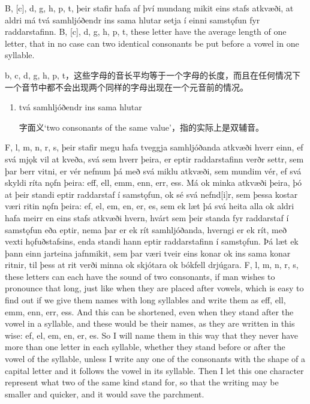 \begin{paracol}{2}
    B, [c], d, g, h, p, t, þeir stafir hafa af því mundang mikit eins stafs atkvæði, at aldri má tvá samhljóðendr ins sama hlutar setja í einni samstǫfun fyr raddarstafinn.
    \switchcolumn
    B, [c], d, g, h, p, t, these letter have the average length of one letter, that in no case can two identical consonants be put before a vowel in one syllable.
\end{paracol}
\begin{translation*}{}
    b, c, d, g, h, p, t，这些字母的音长平均等于一个字母的长度，而且在任何情况下一个音节中都不会出现两个同样的字母出现在一个元音前的情况。
\end{translation*}
\begin{grammar*}{}
    \begin{enumerate}[leftmargin=*]
        \item tvá samhljóðendr ins sama hlutar

              字面义`two consonants of the same value'，指的实际上是双辅音。
    \end{enumerate}
\end{grammar*}
\begin{paracol}{2}
    F, l, m, n, r, s, þeir stafir megu hafa tveggja samhljóðanda atkvæði hverr einn, ef svá mjǫk vil at kveða, svá sem hverr þeira, er eptir raddarstafinn verðr settr, sem þar berr vitni, er vér nefnum þá með svá miklu atkvæði, sem mundim vér, ef svá skyldi ríta nǫfn þeira: eff, ell, emm, enn, err, ess. Má ok minka atkvæði þeira, þó at þeir standi eptir raddarstaf í samstǫfun, ok sé svá nefnd[i]r, sem þessa kostar væri ritin nǫfn þeira: ef, el, em, en, er, es, sem ek læt þá svá heita alla ok aldri hafa meirr en eins stafs atkvæði hvern, hvárt sem þeir standa fyr raddarstaf í samstǫfun eða eptir, nema þar er ek rít samhljóðanda, hverngi er ek rít, með vexti hǫfuðstafsins, enda standi hann eptir raddarstafinn í samstǫfun. Þá læt ek þann einn jarteina jafnmikit, sem þar væri tveir eins konar ok ins sama konar ritnir, til þess at rit verði minna ok skjótara ok bókfell drjúgara.
    \switchcolumn
    F, l, m, n, r, s, these letters can each have the sound of two consonants, if man wishes to pronounce that long, just like when they are placed after vowels, which is easy to find out if we give them names with long syllables and write them as eff, ell, emm, enn, err, ess. And this can be shortened, even when they stand after the vowel in a syllable, and these would be their names, as they are written in this wise: ef, el, em, en, er, es. So I will name them in this way that they never have more than one letter in each syllable, whether they stand before or after the vowel of the syllable, unless I write any one of the consonants with the shape of a capital letter and it follows the vowel in its syllable. Then I let this one character represent what two of the same kind stand for, so that the writing may be smaller and quicker, and it would save the parchment.
\end{paracol}
